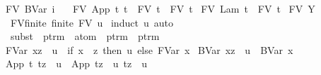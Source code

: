 \begin{isabellebody}
{\isachardoublequoteopen}FV\ {\isacharparenleft}BVar\ i{\isacharparenright}\ {\isacharequal}\ {\isacharbraceleft}{\isacharbraceright}{\isachardoublequoteclose}\ {\isacharbar}\isanewline
{\isachardoublequoteopen}FV\ {\isacharparenleft}App\ t{}\ t{}{\isacharparenright}\ {\isacharequal}\ {\isacharparenleft}FV\ t{}{\isacharparenright}\ {\isasymunion}\ {\isacharparenleft}FV\ t{}{\isacharparenright}{\isachardoublequoteclose}\ {\isacharbar}\isanewline
{\isachardoublequoteopen}FV\ {\isacharparenleft}Lam\ t{\isacharparenright}\ {\isacharequal}\ FV\ t{\isachardoublequoteclose}\ {\isacharbar}\isanewline
{\isachardoublequoteopen}FV\ {\isacharparenleft}Y\ {\isasymsigma}{\isacharparenright}\ {\isacharequal}\ {\isacharbraceleft}{\isacharbraceright}{\isachardoublequoteclose}\isanewline
\isanewline
{}\isamarkupfalse%
\ FV{\isacharunderscore}finite{\isacharcolon}\ {\isachardoublequoteopen}finite\ {\isacharparenleft}FV\ u{\isacharparenright}{\isachardoublequoteclose}\isanewline
%
\isadelimproof
%
\endisadelimproof
%
\isatagproof
{}\isamarkupfalse%
\ {\isacharparenleft}induct\ u{\isacharcomma}\ auto{\isacharparenright}%
\endisatagproof
{\isafoldproof}%
%
\isadelimproof
\isanewline
%
\endisadelimproof
\isanewline
{}\isamarkupfalse%
\ subst\ {\isacharcolon}{\isacharcolon}\ {\isachardoublequoteopen}ptrm\ {\isasymRightarrow}\ atom\ {\isasymRightarrow}\ ptrm\ {\isasymRightarrow}\ ptrm{\isachardoublequoteclose}\ {\isacharparenleft}{\isachardoublequoteopen}{\isacharunderscore}\ {\isacharbrackleft}{\isacharunderscore}\ {\isacharcolon}{\isacharcolon}{\isacharequal}\ {\isacharunderscore}{\isacharbrackright}{\isachardoublequoteclose}\ {\isacharbrackleft}{}{}{\isacharcomma}\ {}{}{\isacharcomma}\ {}{}{\isacharbrackright}\ {}{}{\isacharparenright}\ \isanewline
{\isachardoublequoteopen}{\isacharparenleft}FVar\ x{\isacharparenright}{\isacharbrackleft}z\ {\isacharcolon}{\isacharcolon}{\isacharequal}\ u{\isacharbrackright}\ {\isacharequal}\ {\isacharparenleft}if\ x\ {\isacharequal}\ z\ then\ u\ else\ FVar\ x{\isacharparenright}{\isachardoublequoteclose}\ {\isacharbar}\isanewline
{\isachardoublequoteopen}{\isacharparenleft}BVar\ x{\isacharparenright}{\isacharbrackleft}z\ {\isacharcolon}{\isacharcolon}{\isacharequal}\ u{\isacharbrackright}\ {\isacharequal}\ BVar\ x{\isachardoublequoteclose}\ {\isacharbar}\isanewline
{\isachardoublequoteopen}{\isacharparenleft}App\ t{}\ t{}{\isacharparenright}{\isacharbrackleft}z\ {\isacharcolon}{\isacharcolon}{\isacharequal}\ u{\isacharbrackright}\ {\isacharequal}\ App\ {\isacharparenleft}t{}{\isacharbrackleft}z\ {\isacharcolon}{\isacharcolon}{\isacharequal}\ u{\isacharbrackright}{\isacharparenright}\ {\isacharparenleft}t{}{\isacharbrackleft}z\ {\isacharcolon}{\isacharcolon}{\isacharequal}\ u{\isacharbrackright}{\isacharparenright}{\isachardoublequoteclose}\ {\isacharbar}\isanewline

\end{isabellebody}
